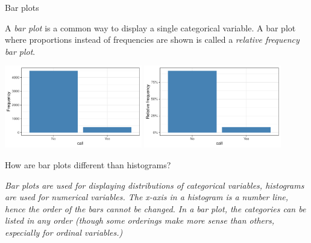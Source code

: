 \documentclass[notes,11pt, aspectratio=169]{beamer}
\newcommand{\hl}[1]{\textit{\textcolor{hlblue}{#1}}}
\newcommand{\dq}[1]{
\begin{beamerboxesrounded}[shadow = false, lower = disc ques body]{}
#1
\end{beamerboxesrounded}
}
\begin{document}
\begin{frame}[fragile]{Bar plots}

A \hl{bar plot} is a common way to display a single categorical variable. A bar plot where proportions instead of frequencies are shown is called a \hl{relative frequency bar plot}.

\begin{center}
\includegraphics[width=0.45\textwidth]{graphs/l02f14a}
\includegraphics[width=0.45\textwidth]{graphs/l02f14b}
\end{center}

\pause

\dq{How are bar plots different than histograms?}

\pause
\colorbox{textboxgreen!75}{\parbox{0.75\textwidth}{\textit{{\tiny Bar plots are used for displaying distributions of categorical variables,  histograms are used for numerical variables. The x-axis in a histogram is a number line,  hence the order of the bars cannot be changed. In a bar plot, the categories can be listed in any order (though some orderings make more sense than others, especially for ordinal variables.)}}}}

\end{frame}
\end{document}
